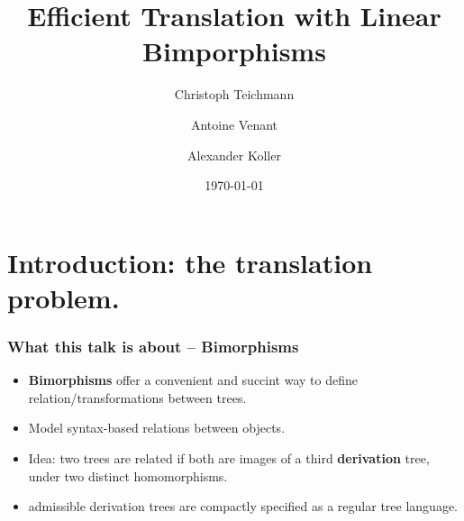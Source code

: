 \documentclass{beamer}
\begin{document}
\title{Efficient Translation with Linear Bimporphisms} 
\author[Antoine Venant]{Christoph Teichmann \and Antoine Venant \and Alexander Koller}
\date{\today}
\maketitle


\section{Introduction: the translation problem.}

\begin{frame}
  \frametitle{What this talk is about -- Bimorphisms}
  \begin{itemize}
  \item \textbf{Bimorphisms} offer a convenient and succint way to define relation/transformations between trees.
  \item Model syntax-based relations between objects.
  \item Idea: two trees are related if both are images of a third \textbf{derivation} tree, under two distinct homomorphisms.
  \item admissible derivation trees are compactly specified as a regular tree language. 
  \end{itemize}
\end{frame}















\end{document}
